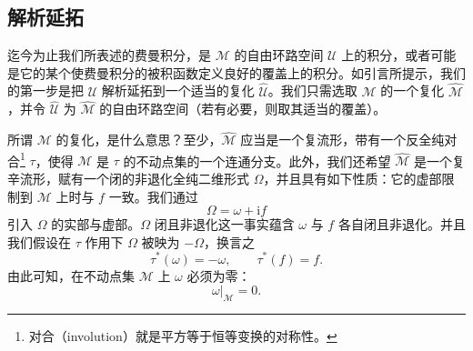 \documentclass[11pt,a4paper,UTF8]{ctexart}
\theoremstyle{plain}
\theoremstyle{definition}
\begin{document}

\subsection{解析延拓}

迄今为止我们所表述的费曼积分，是 $\mathcal{M}$ 的自由环路空间 $\mathcal{U}$ 上的积分，或者可能是它的某个使费曼积分的被积函数定义良好的覆盖上的积分。如引言所提示，我们的第一步是把 $\mathcal{U}$ 解析延拓到一个适当的复化 $\widehat{\mathcal{U}}$。我们只需选取 $\mathcal{M}$ 的一个复化 $\widehat{\mathcal{M}}$，并令 $\widehat{\mathcal{U}}$ 为 $\widehat{\mathcal{M}}$ 的自由环路空间（若有必要，则取其适当的覆盖）。

所谓 $\mathcal{M}$ 的复化，是什么意思？至少，$\widehat{\mathcal{M}}$ 应当是一个复流形，带有一个反全纯对合\footnote{对合（involution）就是平方等于恒等变换的对称性。} $\tau$，使得 $\mathcal{M}$ 是 $\tau$ 的不动点集的一个连通分支。此外，我们还希望 $\widehat{\mathcal{M}}$ 是一个复辛流形，赋有一个闭的非退化全纯二维形式 $\Omega$，并且具有如下性质：它的虚部限制到 $\mathcal{M}$ 上时与 $f$ 一致。我们通过
\begin{equation}
    \Omega = \omega+\mathrm{i}f
    \tag{2.11}
\end{equation}
引入 $\Omega$ 的实部与虚部。$\Omega$ 闭且非退化这一事实蕴含 $\omega$ 与 $f$ 各自闭且非退化。并且我们假设在 $\tau$ 作用下 $\Omega$ 被映为 $-\Omega$，换言之
\begin{equation}
    \tau^*(\omega) = -\omega,\qquad \tau^*(f) = f .
    \tag{2.12}
\end{equation}
由此可知，在不动点集 $\mathcal{M}$ 上 $\omega$ 必须为零：
\begin{equation}
    \omega|_{\mathcal{M}} = 0 .
    \tag{2.13}
\end{equation}
\end{document}
